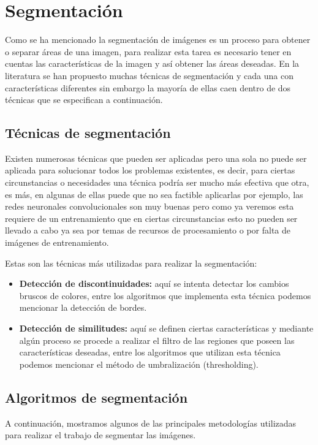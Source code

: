 \documentclass[conference,compsoc]{IEEEtran}
\begin{document}
\section{Segmentación}
Como se ha mencionado la segmentación de imágenes es un proceso para obtener o separar áreas de una imagen, para realizar esta tarea es necesario tener en cuentas las características de la imagen y así obtener las áreas deseadas. En la literatura se han propuesto muchas técnicas de segmentación y cada una con características diferentes sin embargo la mayoría de ellas caen dentro de dos técnicas que se especifican a continuación.

\subsection{Técnicas de segmentación}
Existen numerosas técnicas que pueden ser aplicadas pero una sola no puede ser aplicada para solucionar todos los problemas existentes, es decir, para ciertas circunstancias o necesidades una técnica podría ser mucho más efectiva que otra, es más, en algunas de ellas puede que no sea factible aplicarlas\cite{tecsegm} por ejemplo, las redes neuronales convolucionales son muy buenas pero como ya veremos esta requiere de un entrenamiento que en ciertas circunstancias esto no pueden ser llevado a cabo ya sea por temas de recursos de procesamiento o por falta de imágenes de entrenamiento. 

Estas son las técnicas más utilizadas para realizar la segmentación:

\begin{itemize}
\item \textbf{Detección de discontinuidades:} aquí se intenta detectar los cambios bruscos de colores, entre los algoritmos que implementa esta técnica podemos mencionar la detección de bordes.
\item \textbf{Detección de similitudes:} aquí se definen ciertas características y mediante algún proceso se procede a realizar el filtro de las regiones que poseen las características deseadas, entre los algoritmos que utilizan esta técnica podemos mencionar el método de umbralización (thresholding).
\end{itemize}

\subsection{Algoritmos de segmentación}
A continuación, mostramos algunos de las principales metodologías utilizadas para realizar el trabajo de segmentar las imágenes.
\end{document}
